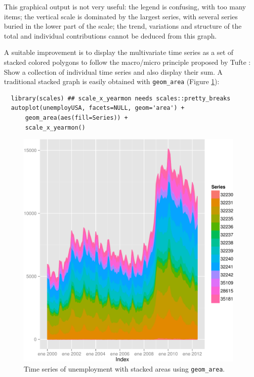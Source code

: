 \documentclass[smallroyalvopaper]{memoir}
\begin{document}
This graphical output is not very useful: the legend is confusing,
with too many items; the vertical scale is dominated by the largest
series, with several series buried in the lower part of the scale; the
trend, variations and structure of the total and individual
contributions cannot be deduced from this graph.

A suitable improvement is to display the multivariate time series as a
set of stacked colored polygons to follow the macro/micro principle
proposed by Tufte \cite{Tufte1990}: Show a collection of individual
time series and also display their sum. A traditional stacked graph is
easily obtained with \texttt{geom\_area} (Figure \ref{fig:unemployUSAgeomArea}):

\lstset{language=r,label= ,caption= ,captionpos=b,numbers=none}
\begin{lstlisting}
  library(scales) ## scale_x_yearmon needs scales::pretty_breaks
  autoplot(unemployUSA, facets=NULL, geom='area') +
      geom_area(aes(fill=Series)) +
      scale_x_yearmon()  
\end{lstlisting}

\begin{figure}[htbp]
\centering
\includegraphics[width=.9\linewidth]{figs/unemployUSAgeomArea.pdf}
\caption{Time series of unemployment with stacked areas using \texttt{geom\_area}. \label{fig:unemployUSAgeomArea}}
\end{figure}
\end{document}
